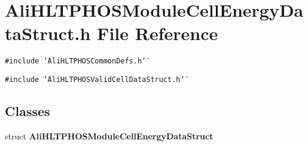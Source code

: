 \section{Ali\-HLTPHOSModule\-Cell\-Energy\-Data\-Struct.h File Reference}
\label{AliHLTPHOSModuleCellEnergyDataStruct_8h}


{\tt \#include \char`\"{}Ali\-HLTPHOSCommon\-Defs.h\char`\"{}}\par
{\tt \#include \char`\"{}Ali\-HLTPHOSValid\-Cell\-Data\-Struct.h\char`\"{}}\par
\subsection*{Classes}
\begin{CompactItemize}
\item 
struct {\bf Ali\-HLTPHOSModule\-Cell\-Energy\-Data\-Struct}
\end{CompactItemize}
